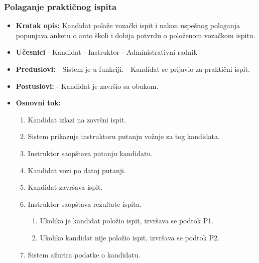 \subsubsection{Polaganje praktičnog ispita}

\vspace{3mm}

\begin{itemize}

\item \textbf{Kratak opis:} Kandidat polaže vozački ispit i nakon uspešnog polaganja popunjava anketu o auto školi i dobija potvrdu o položenom vozačkom ispitu.

\vspace{2mm}

\item \textbf{Učesnici} \newline
   - Kandidat \newline   
   - Instruktor \newline
   - Administrativni radnik 
   
\item \textbf{Preduslovi:} \newline
   - Sistem je u funkciji. \newline
   - Kandidat se prijavio za praktični ispit.

\item \textbf{Postuslovi:} \newline
    - Kandidat je završio sa obukom.

\item \textbf{Osnovni tok:}  
   \begin{enumerate}
   \item Kandidat izlazi na završni ispit.
   \item Sistem prikazuje instruktoru putanju vožnje za tog kandidata.
   \item Instruktor saopštava putanju kandidatu.
   \item Kandidat vozi po datoj putanji.
   \item Kandidat završava ispit.
   \item Instruktor saopštava rezultate ispita.
   \begin{enumerate}
       \item Ukoliko je kandidat položio ispit, izvršava se podtok P1.
       \item Ukoliko kandidat nije položio ispit, izvršava se podtok P2.
   \end{enumerate}
   \item Sistem ažurira podatke o kandidatu.     


\end{enumerate}
\end{itemize}
